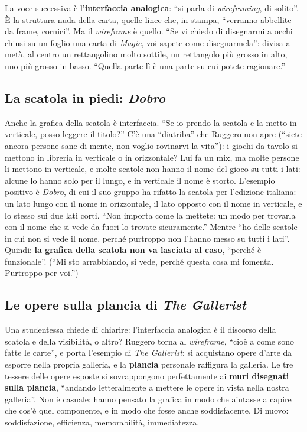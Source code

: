 La voce successiva è l'\textbf{interfaccia analogica}: ``si parla di
\emph{wireframing}, di solito''. È la struttura nuda della carta, quelle linee che, in
stampa, ``verranno abbellite da frame, cornici''. Ma il \emph{wireframe} è quello. ``Se
vi chiedo di disegnarmi a occhi chiusi su un foglio una carta di \emph{Magic}, voi sapete
come disegnarmela'': divisa a metà, al centro un rettangolino molto sottile, un
rettangolo più grosso in alto, uno più grosso in basso. ``Quella parte lì è una parte su
cui potete ragionare.''

\subsection{La scatola in piedi: \emph{Dobro}}

Anche la grafica della scatola è interfaccia. ``Se io prendo la scatola e la metto in
verticale, posso leggere il titolo?'' C'è una ``diatriba'' che Ruggero non apre
(``siete ancora persone sane di mente, non voglio rovinarvi la vita''): i giochi da
tavolo si mettono in libreria in verticale o in orizzontale? Lui fa un mix, ma molte
persone li mettono in verticale, e molte scatole non hanno il nome del gioco su tutti i
lati: alcune lo hanno solo per il lungo, e in verticale il nome è storto. L'esempio
positivo è \emph{Dobro}, di cui il suo gruppo ha rifatto la scatola per l'edizione
italiana: un lato lungo con il nome in orizzontale, il lato opposto con il nome in
verticale, e lo stesso sui due lati corti. ``Non importa come la mettete: un modo per
trovarla con il nome che si vede da fuori lo trovate sicuramente.'' Mentre ``ho delle
scatole in cui non si vede il nome, perché purtroppo non l'hanno messo su tutti i
lati''. Quindi: \textbf{la grafica della scatola non va lasciata al caso}, ``perché è
funzionale''. (``Mi sto arrabbiando, si vede, perché questa cosa mi fomenta.
Purtroppo per voi.'')

\subsection{Le opere sulla plancia di \emph{The Gallerist}}

Una studentessa chiede di chiarire: l'interfaccia analogica è il discorso della scatola
e della visibilità, o altro? Ruggero torna al \emph{wireframe}, ``cioè a come sono fatte
le carte'', e porta l'esempio di \emph{The Gallerist}: si acquistano opere d'arte da
esporre nella propria galleria, e la \textbf{plancia} personale raffigura la galleria.
Le tre tessere delle opere esposte si sovrappongono perfettamente ai \textbf{muri
disegnati sulla plancia}, ``andando letteralmente a mettere le opere in vista nella
nostra galleria''. Non è casuale: hanno pensato la grafica in modo che aiutasse a capire
che cos'è quel componente, e in modo che fosse anche soddisfacente. Di nuovo:
soddisfazione, efficienza, memorabilità, immediatezza.

